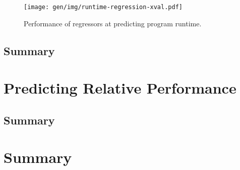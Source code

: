\begin{figure}
\centering
\texttt{[image: gen/img/runtime-regression-xval.pdf]}
\caption{%
  Performance of regressors at predicting program runtime.%
}
\end{figure}

\subsection{Summary}


\section{Predicting Relative Performance}

\subsection{Summary}






\section{Summary}

% 

% 
